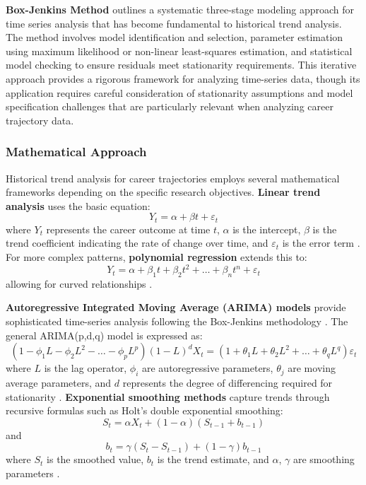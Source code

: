 \documentclass[../main.tex]{subfiles}
\begin{document}

\textbf{Box-Jenkins Method} \parencite{wikipedia2005} outlines a systematic three-stage modeling approach for time series analysis that has become fundamental to historical trend analysis. The method involves model identification and selection, parameter estimation using maximum likelihood or non-linear least-squares estimation, and statistical model checking to ensure residuals meet stationarity requirements. This iterative approach provides a rigorous framework for analyzing time-series data, though its application requires careful consideration of stationarity assumptions and model specification challenges that are particularly relevant when analyzing career trajectory data.

\subsubsection{Mathematical Approach}

Historical trend analysis for career trajectories employs several mathematical frameworks depending on the specific research objectives. \textbf{Linear trend analysis} uses the basic equation: 
\[
Y_t = \alpha + \beta t + \varepsilon_t
\]
where $Y_t$ represents the career outcome at time $t$, $\alpha$ is the intercept, $\beta$ is the trend coefficient indicating the rate of change over time, and $\varepsilon_t$ is the error term \parencite{quantilope2023}. For more complex patterns, \textbf{polynomial regression} extends this to: 
\[
Y_t = \alpha + \beta_1 t + \beta_2 t^2 + \ldots + \beta_n t^n + \varepsilon_t
\]
allowing for curved relationships \parencite{quantilope2023}.

\textbf{Autoregressive Integrated Moving Average (ARIMA) models} provide sophisticated time-series analysis following the Box-Jenkins methodology \parencite{wikipedia2005}. The general ARIMA(p,d,q) model is expressed as: 
\[
(1-\phi_1 L-\phi_2 L^2-\ldots-\phi_p L^p)(1-L)^d X_t = (1+\theta_1 L+\theta_2 L^2+\ldots+\theta_q L^q)\varepsilon_t
\]
where $L$ is the lag operator, $\phi_i$ are autoregressive parameters, $\theta_j$ are moving average parameters, and $d$ represents the degree of differencing required for stationarity \parencite{wikipedia2005}. \textbf{Exponential smoothing methods} capture trends through recursive formulas such as Holt's double exponential smoothing: 
\[
S_t = \alpha X_t + (1-\alpha)(S_{t-1} + b_{t-1})
\]
and 
\[
b_t = \gamma(S_t - S_{t-1}) + (1-\gamma)b_{t-1}
\]
where $S_t$ is the smoothed value, $b_t$ is the trend estimate, and $\alpha$, $\gamma$ are smoothing parameters \parencite{quantilope2023}.
\end{document}
